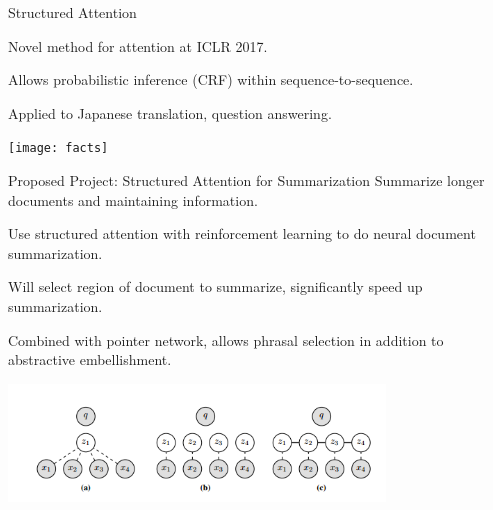 \documentclass{beamer}
\let\tempone\itemize
\let\temptwo\enditemize
\renewenvironment{itemize}{\tempone\addtolength{\itemsep}{0.5\baselineskip}}{\temptwo}
\newcommand{\Cite}[1]{{\footnotesize \citep{#1}}}
\begin{document}
\begin{frame}{Structured Attention \Cite{kim2017structured}}
  \begin{itemize}
  \item Novel method for attention at ICLR 2017.
  \item Allows probabilistic inference (CRF) within sequence-to-sequence.
  \item Applied to Japanese translation, question answering.
  \end{itemize}
  \begin{center}
    \texttt{[image: facts]}
  \end{center}
  
\end{frame}

\begin{frame}{Proposed Project: Structured Attention for Summarization}
   Summarize longer documents and maintaining information.
  \begin{itemize}
  \item Use structured attention with reinforcement learning to 
    do neural document summarization.
  \item Will select region of document to summarize, significantly 
    speed up summarization.
  \item Combined with pointer network, allows phrasal selection 
    in addition to abstractive embellishment.
  \end{itemize}
  \begin{center}
    \includegraphics[width=10cm]{structattn}
  \end{center}

\end{frame}
\end{document}
